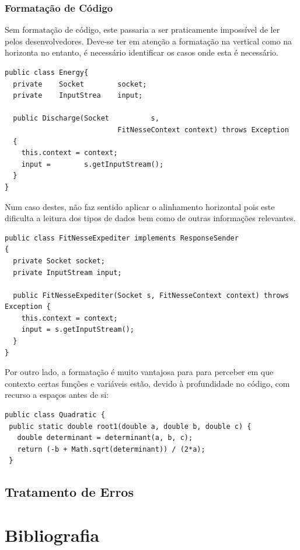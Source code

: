 \documentclass[10pt,portuguese]{article}
\begin{document}
\subsubsection{Formatação de Código}

\par Sem formatação de código, este passaria a ser praticamente impossível de ler pelos desenvolvedores. Deve-se ter em atenção a formatação na vertical como na horizonta no entanto, é necessário identificar os casos onde esta é necessário.

\begin{lstlisting}
public class Energy{
  private    Socket        socket;
  private    InputStrea    input;

  public Discharge(Socket          s,
                           FitNesseContext context) throws Exception
  {
    this.context = context;
    input =        s.getInputStream();
  }
}
\end{lstlisting}

\Par Num caso destes, não faz sentido aplicar o alinhamento horizontal pois este dificulta a leitura dos tipos de dados bem como de outras informações relevantes.

\begin{lstlisting}
public class FitNesseExpediter implements ResponseSender
{
  private Socket socket;
  private InputStream input;

  public FitNesseExpediter(Socket s, FitNesseContext context) throws Exception {
    this.context = context;
    input = s.getInputStream();
  }
}
\end{lstlisting}

\Par Por outro lado, a formatação é muito vantajosa para para perceber em que contexto certas funções e variáveis estão, devido à profundidade no código, com recurso a espaços antes de si:

\begin{lstlisting}
public class Quadratic {
 public static double root1(double a, double b, double c) {
   double determinant = determinant(a, b, c);
   return (-b + Math.sqrt(determinant)) / (2*a);
 }
\end{lstlisting}

\subsection{Tratamento de Erros}

\clearpage

\section{Bibliografia}
\end{document}
